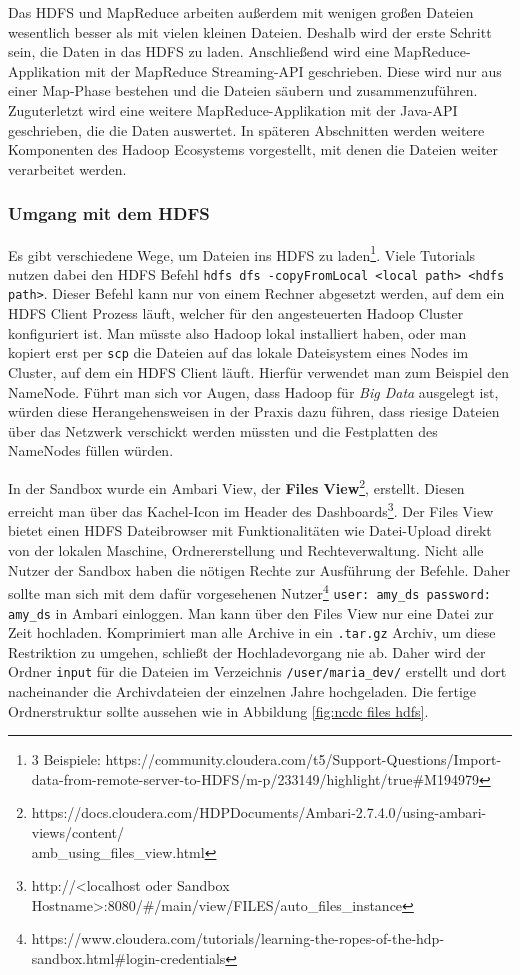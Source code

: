 Das HDFS und MapReduce arbeiten außerdem mit wenigen großen Dateien wesentlich besser als mit vielen kleinen Dateien. Deshalb wird der erste Schritt sein, die Daten in das HDFS zu laden. Anschließend wird eine MapReduce-Applikation mit der MapReduce Streaming-API geschrieben. Diese wird nur aus einer Map-Phase bestehen und die Dateien säubern und zusammenzuführen. Zuguterletzt wird eine weitere MapReduce-Applikation mit der Java-API geschrieben, die die Daten auswertet. In späteren Abschnitten werden weitere Komponenten des Hadoop Ecosystems vorgestellt, mit denen die Dateien weiter verarbeitet werden.
\subsubsection*{Umgang mit dem HDFS}
\label{chap:fund sec:core sub:handson hdfs}
Es gibt verschiedene Wege, um Dateien ins HDFS zu laden\footnote{3 Beispiele: https://community.cloudera.com/t5/Support-Questions/Import-data-from-remote-server-to-HDFS/m-p/233149/highlight/true\#M194979}. Viele Tutorials nutzen dabei den HDFS Befehl \verb|hdfs dfs -copyFromLocal <local path> <hdfs path>|. Dieser Befehl kann nur von einem Rechner abgesetzt werden, auf dem ein HDFS Client Prozess läuft, welcher für den angesteuerten Hadoop Cluster konfiguriert ist. Man müsste also Hadoop lokal installiert haben, oder man kopiert erst per \verb|scp| die Dateien auf das lokale Dateisystem eines Nodes im Cluster, auf dem ein HDFS Client läuft. Hierfür verwendet man zum Beispiel den NameNode. Führt man sich vor Augen, dass Hadoop für \textit{Big Data} ausgelegt ist, würden diese Herangehensweisen in der Praxis dazu führen, dass riesige Dateien über das Netzwerk verschickt werden müssten und die Festplatten des NameNodes füllen würden.
\par
In der Sandbox wurde ein Ambari View, der \textbf{Files View}\footnote{https://docs.cloudera.com/HDPDocuments/Ambari-2.7.4.0/using-ambari-views/content/\\amb\_using\_files\_view.html}, erstellt. Diesen erreicht man über das Kachel-Icon im Header des Dashboards\footnote{http://<localhost oder Sandbox Hostname>:8080/\#/main/view/FILES/auto\_files\_instance}. Der Files View bietet einen HDFS Dateibrowser mit Funktionalitäten wie Datei-Upload direkt von der lokalen Maschine, Ordnererstellung und Rechteverwaltung. Nicht alle Nutzer der Sandbox haben die nötigen Rechte zur Ausführung der Befehle. Daher sollte man sich mit dem dafür vorgesehenen Nutzer\footnote{https://www.cloudera.com/tutorials/learning-the-ropes-of-the-hdp-sandbox.html\#login-credentials} \verb|user: amy_ds password: amy_ds| in Ambari einloggen. Man kann über den Files View nur eine Datei zur Zeit hochladen. Komprimiert man alle Archive in ein \verb|.tar.gz| Archiv, um diese Restriktion zu umgehen, schließt der Hochladevorgang nie ab. Daher wird der Ordner \verb|input| für die Dateien im Verzeichnis \verb|/user/maria_dev/| erstellt und dort nacheinander die Archivdateien der einzelnen Jahre hochgeladen. Die fertige Ordnerstruktur sollte aussehen wie in Abbildung \ref{fig:ncdc files hdfs}.

